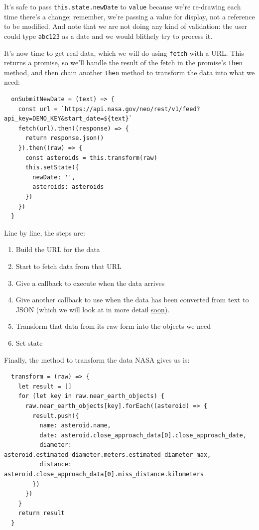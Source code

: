 It's safe to pass \texttt{this.state.newDate} to \texttt{value} because
we're re-drawing each time there's a change; remember, we're passing a
value for display, not a reference to be modified. And note that we are
not doing any kind of validation: the user could type \texttt{abc123} as
a date and we would blithely try to process it.

It's now time to get real data, which we will do using \texttt{fetch}
with a URL. This returns a \protect\hyperlink{s:promises}{promise}, so
we'll handle the result of the fetch in the promise's \texttt{then}
method, and then chain another \texttt{then} method to transform the
data into what we need:

\begin{verbatim}
  onSubmitNewDate = (text) => {
    const url = `https://api.nasa.gov/neo/rest/v1/feed?api_key=DEMO_KEY&start_date=${text}`
    fetch(url).then((response) => {
      return response.json()
    }).then((raw) => {
      const asteroids = this.transform(raw)
      this.setState({
        newDate: '',
        asteroids: asteroids
      })
    })
  }
\end{verbatim}

Line by line, the steps are:

\begin{enumerate}
\tightlist
\item
  Build the URL for the data
\item
  Start to fetch data from that URL
\item
  Give a callback to execute when the data arrives
\item
  Give another callback to use when the data has been converted from
  text to JSON (which we will look at in more detail
  \protect\hyperlink{s:dataman}{soon}).
\item
  Transform that data from its raw form into the objects we need
\item
  Set state
\end{enumerate}

Finally, the method to transform the data NASA gives us is:

\begin{verbatim}
  transform = (raw) => {
    let result = []
    for (let key in raw.near_earth_objects) {
      raw.near_earth_objects[key].forEach((asteroid) => {
        result.push({
          name: asteroid.name,
          date: asteroid.close_approach_data[0].close_approach_date,
          diameter: asteroid.estimated_diameter.meters.estimated_diameter_max,
          distance: asteroid.close_approach_data[0].miss_distance.kilometers
        })
      })
    }
    return result
  }
\end{verbatim}


